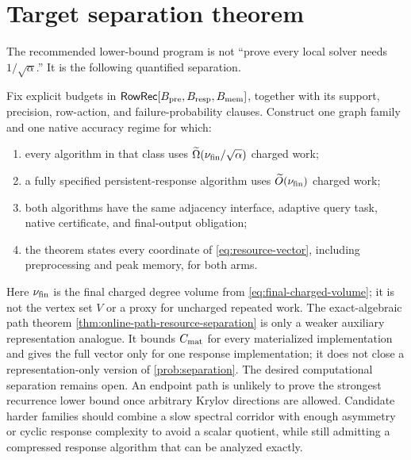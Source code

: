 \section{Target separation theorem}
\label{sec:target}

The recommended lower-bound program is not ``prove every local solver needs
$1/\sqrt\alpha$.''  It is the following quantified separation.

\begin{problem}
\label{prob:separation}
Fix explicit budgets in
$\mathsf{RowRec}[B_{\rm pre},B_{\rm resp},B_{\rm mem}]$, together with its
support, precision, row-action, and failure-probability clauses.  Construct one
graph family and one native accuracy regime for which:
\begin{enumerate}[label=(\roman*)]
\item every algorithm in that class uses
      $\widetilde\Omega(\nu_{\rm fin}/\sqrt\alpha)$ charged work;
\item a fully specified persistent-response algorithm uses
      $\widetilde O(\nu_{\rm fin})$ charged work;
\item both algorithms have the same adjacency interface, adaptive query task,
      native certificate, and final-output obligation;
\item the theorem states every coordinate of
      \cref{eq:resource-vector}, including preprocessing and peak memory, for
      both arms.
\end{enumerate}
\end{problem}

Here $\nu_{\rm fin}$ is the final charged degree volume from
\cref{eq:final-charged-volume}; it is not the vertex set $V$ or a proxy for
uncharged repeated work.  The exact-algebraic path theorem
\cref{thm:online-path-resource-separation} is only a weaker auxiliary
representation analogue.  It bounds $C_{\rm mat}$ for every materialized
implementation and gives the full vector only for one response
implementation; it does not close a representation-only version of
\cref{prob:separation}.  The desired computational separation remains open.
An endpoint path is unlikely to prove the strongest recurrence lower bound
once arbitrary Krylov directions are allowed.  Candidate harder families
should combine a slow spectral corridor with enough asymmetry or cyclic
response complexity to avoid a scalar quotient, while still admitting a
compressed response algorithm that can be analyzed exactly.
